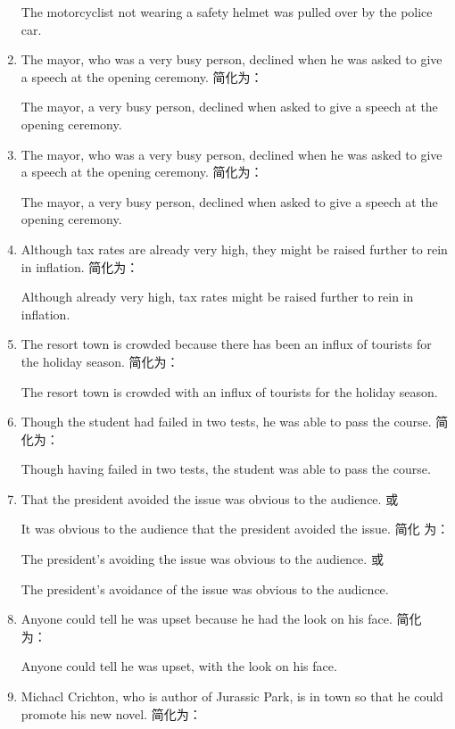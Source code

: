 \begin{enumerate}
  The motorcyclist not wearing a safety helmet was pulled over by the police
  car.
\item The mayor, who was a very busy person, declined when he was asked to give
  a speech at the opening ceremony. 简化为：

  The mayor, a very busy person, declined when asked to give a speech at the
  opening ceremony.

\item The mayor, who was a very busy person, declined when he was asked to give
  a speech at the opening ceremony. 简化为：

  The mayor, a very busy person, declined when asked to give a speech at the
  opening ceremony.

\item Although tax rates are already very high, they might be raised further to
  rein in inflation. 简化为：

  Although already very high, tax rates might be raised further to rein in
  inflation.

\item The resort town is crowded because there has been an influx of tourists
  for the holiday season. 简化为：

  The resort town is crowded with an influx of tourists for the holiday
  season.

\item Though the student had failed in two tests, he was able to pass the
  course. 简化为：

  Though having failed in two tests, the student was able to pass the
  course.

\item That the president avoided the issue was obvious to the audience. 或

  It was obvious to the audience that the president avoided the issue. 简化
  为：

  The president's avoiding the issue was obvious to the audience. 或

  The president's avoidance of the issue was obvious to the audicnce.
\item Anyone could tell he was upset because he had the look on his face. 简化
  为：

  Anyone could tell he was upset, with the look on his face.

\item Michacl Crichton, who is author of Jurassic Park, is in town so that he
  could promote his new novel. 简化为：


\end{enumerate}
